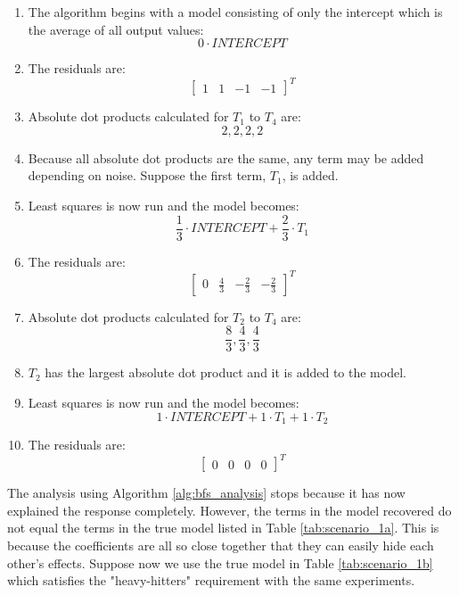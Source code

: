 \begin{enumerate}  
\item The algorithm begins with a model consisting of only the intercept which is the average of all output values:
	\[
		0 \cdot \mathit{INTERCEPT}
	\]
\item The residuals are:
	\[
		{\begin{bmatrix} 1 & 1 & -1 & -1 \end{bmatrix}}^T
	\]
\item Absolute dot products calculated for $T_{1}$ to $T_{4}$ are:
	\[
		2, 2, 2, 2
	\]
\item Because all absolute dot products are the same, any term may be added depending on noise.
	Suppose the first term, $T_{1}$, is added.
\item Least squares is now run and the model becomes:
	\[
		\frac{1}{3} \cdot \mathit{INTERCEPT} + \frac{2}{3} \cdot T_{1}
	\]
\item The residuals are:
	\[
		{\begin{bmatrix} 0 & \frac{4}{3} & -\frac{2}{3} & -\frac{2}{3} \end{bmatrix}}^T
	\]
\item Absolute dot products calculated for $T_{2}$ to $T_{4}$ are:
	\[
		\frac{8}{3}, \frac{4}{3}, \frac{4}{3}
	\]
\item $T_{2}$ has the largest absolute dot product and it is added to the model.
\item Least squares is now run and the model becomes:
	\[
		1 \cdot \mathit{INTERCEPT} + 1 \cdot T_{1} + 1 \cdot T_{2}
	\]
\item The residuals are:
	\[
		{\begin{bmatrix} 0 & 0 & 0 & 0 \end{bmatrix}}^T
	\]
\end{enumerate}

The analysis using Algorithm \ref{alg:bfs_analysis} stops because it has now explained the response completely.
However, the terms in the model recovered do not equal the terms in the true model listed in Table \ref{tab:scenario_1a}.
This is because the coefficients are all so close together that they can easily hide each other's effects.
Suppose now we use the true model in Table \ref{tab:scenario_1b} which satisfies the "heavy-hitters" requirement with the same experiments.

